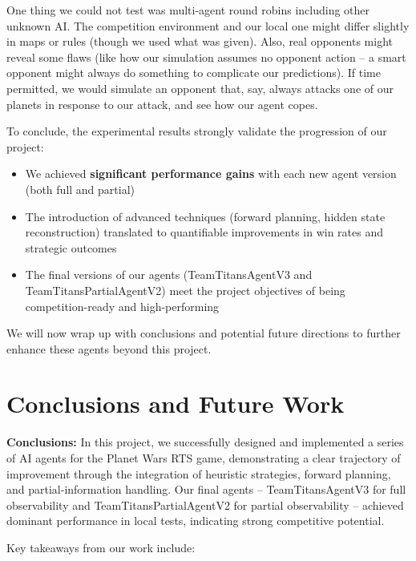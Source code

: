\documentclass[conference]{IEEEtran}
\begin{document}
One thing we could not test was multi-agent round robins including other unknown AI. The competition environment and our local one might differ slightly in maps or rules (though we used what was given). Also, real opponents might reveal some flaws (like how our simulation assumes no opponent action -- a smart opponent might always do something to complicate our predictions). If time permitted, we would simulate an opponent that, say, always attacks one of our planets in response to our attack, and see how our agent copes.

To conclude, the experimental results strongly validate the progression of our project:
\begin{itemize}
\item We achieved \textbf{significant performance gains} with each new agent version (both full and partial)
\item The introduction of advanced techniques (forward planning, hidden state reconstruction) translated to quantifiable improvements in win rates and strategic outcomes
\item The final versions of our agents (TeamTitansAgentV3 and TeamTitansPartialAgentV2) meet the project objectives of being competition-ready and high-performing
\end{itemize}

We will now wrap up with conclusions and potential future directions to further enhance these agents beyond this project.

\section{Conclusions and Future Work}

\textbf{Conclusions:} In this project, we successfully designed and implemented a series of AI agents for the Planet Wars RTS game, demonstrating a clear trajectory of improvement through the integration of heuristic strategies, forward planning, and partial-information handling. Our final agents -- TeamTitansAgentV3 for full observability and TeamTitansPartialAgentV2 for partial observability -- achieved dominant performance in local tests, indicating strong competitive potential.

Key takeaways from our work include:
\end{document}
